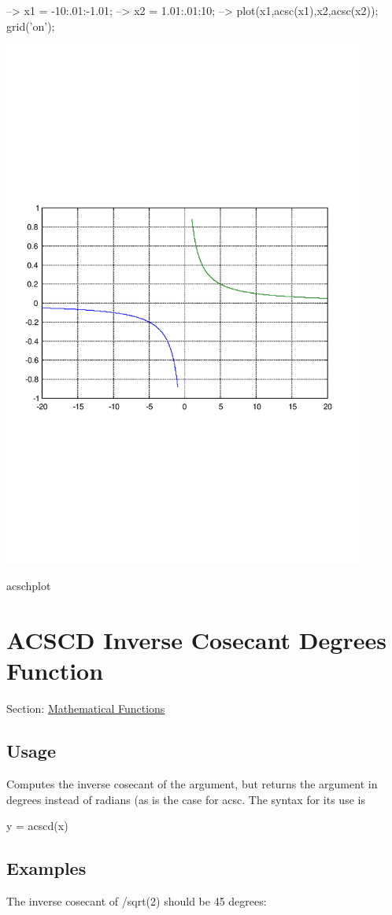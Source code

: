 \begin{DoxyVerbInclude}
--> x1 = -10:.01:-1.01;
--> x2 = 1.01:.01:10;
--> plot(x1,acsc(x1),x2,acsc(x2)); grid('on');
\end{DoxyVerbInclude}


 
\begin{DoxyImage}
\includegraphics[width=12cm]{acschplot}
\caption{acschplot}
\end{DoxyImage}
 \hypertarget{mathfunctions_acscd}{}\section{A\-C\-S\-C\-D Inverse Cosecant Degrees Function}\label{mathfunctions_acscd}
Section\-: \hyperlink{sec_mathfunctions}{Mathematical Functions} \hypertarget{vtkwidgets_vtkxyplotwidget_Usage}{}\subsection{Usage}\label{vtkwidgets_vtkxyplotwidget_Usage}
Computes the inverse cosecant of the argument, but returns the argument in degrees instead of radians (as is the case for {\ttfamily acsc}. The syntax for its use is \begin{DoxyVerb}   y = acscd(x)
\end{DoxyVerb}
 \hypertarget{variables_matrix_Examples}{}\subsection{Examples}\label{variables_matrix_Examples}
The inverse cosecant of {/sqrt(2)} should be 45 degrees\-:


